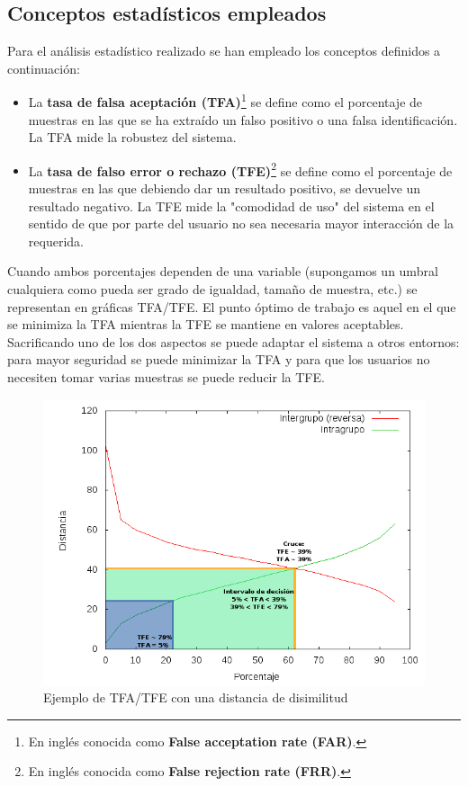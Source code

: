 \subsection{Conceptos estadísticos empleados}
Para el análisis estadístico realizado se han empleado los conceptos definidos a continuación\cite{FRRstatistics}:
\begin{itemize}
	\item{La \textbf{tasa de falsa aceptación (TFA)}\footnote{En inglés conocida como \textbf{False acceptation rate (FAR)}.} se define como el porcentaje de muestras en las que se ha extraído un falso positivo o una falsa identificación. La TFA mide la robustez del sistema.}
	\item{La \textbf{tasa de falso error o rechazo (TFE)}\footnote{En inglés conocida como \textbf{False rejection rate (FRR)}.} se define como el porcentaje de muestras en las que debiendo dar un resultado positivo, se devuelve un resultado negativo. La TFE mide la "comodidad de uso" del sistema en el sentido de que por parte del usuario no sea necesaria mayor interacción de la requerida. }
\end {itemize}

Cuando ambos porcentajes dependen de una variable (supongamos un umbral cualquiera como pueda ser grado de igualdad, tamaño de muestra, etc.) se representan en gráficas TFA/TFE. El punto óptimo de trabajo es aquel en el que se minimiza la TFA mientras la TFE se mantiene en valores aceptables. Sacrificando uno de los dos aspectos se puede adaptar el sistema a otros entornos: para mayor seguridad se puede minimizar la TFA y para que los usuarios no necesiten tomar varias muestras se puede reducir la TFE.

\begin{figure}[!hb]
	\centering
	\includegraphics[width=12cm]{imagenes/grafica_TFA.png}
	\caption{Ejemplo de TFA/TFE con una distancia de disimilitud}
	\label{fig:example_TFA}
\end{figure}

